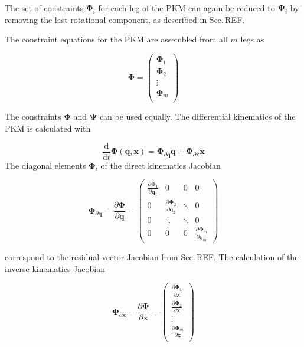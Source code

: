 \documentclass[twocolumn,10pt]{IFTOMM}
\newcommand{\bm}[1]{\boldsymbol{#1}}
\begin{document}
The set of constraints $\bm{\Phi}_{i}$ for each leg of the PKM can again be reduced to $\bm{\Psi}_{i}$ by removing the last rotational component, as described in Sec.\,REF.

The constraint equations for the PKM are assembled from all $m$ legs as


\begin{equation}
\bm{\Phi}
=
\begin{pmatrix}
\bm{\Phi}_1 \\
\bm{\Phi}_2 \\
\vdots \\
\bm{\Phi}_m \\
\end{pmatrix}
\end{equation}

The constraints $\bm{\Phi}$ and $\bm{\Psi}$ can be used equally.
The differential kinematics of the PKM is calculated with




\begin{equation}
\frac{\mathrm{d}}{\mathrm{d}t} \bm{\Phi}(\bm{q},\bm{x})
=
\bm{\Phi}_{\partial \bm{q}}  \dot{\bm{q}}
+
\bm{\Phi}_{\partial \bm{x}} \dot{\bm{x}}
\end{equation}
%
The diagonal elements $\bm{\Phi}_i$ of the direct kinematics Jacobian %

\begin{equation}
\bm{\Phi}_{\partial \bm{q}}
=
\frac{\partial \bm{\Phi}}{\partial \bm{q}}
=
\begin{pmatrix}
\frac{\partial \bm{\Phi}_1}{\partial \bm{q}_1}  & 0 & 0 & 0\\
0 & \frac{\partial \bm{\Phi}_2}{\partial \bm{q}_2} & \ddots & 0  \\
0 & \ddots & \ddots & 0  \\
0 & 0 & 0 &\frac{\partial \bm{\Phi}_m}{\partial \bm{q}_m}
\end{pmatrix}
\end{equation}  

correspond to the residual vector Jacobian from Sec.\,REF.
The calculation of the inverse kinematics Jacobian

\begin{equation}
\bm{\Phi}_{\partial \bm{x}}
=
\frac{\partial \bm{\Phi}}{\partial \bm{x}}
=
\begin{pmatrix}
\frac{\partial \bm{\Phi}_1}{\partial \bm{x}}\\
\frac{\partial \bm{\Phi}_2}{\partial \bm{x}}\\
\vdots \\
\frac{\partial \bm{\Phi}_m}{\partial \bm{x}}\\
\end{pmatrix}
\end{equation}  
\end{document}
